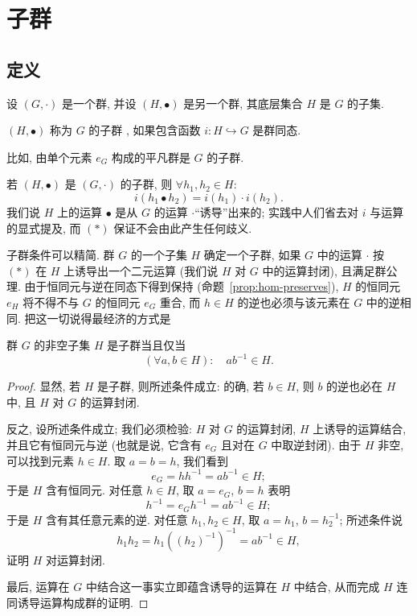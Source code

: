 \section{子群}
\label{subsec:subgroups}

\subsection{定义}
\label{subsec:subgroups-def}

设 $(G, \cdot)$ 是一个群, 并设 $(H, \bullet)$ 是另一个群, 其底层集合 $H$ 是 $G$ 的子集.

\begin{definition}
\label{def:subgroup}
$(H, \bullet)$ 称为 $G$ 的子群%
, 如果包含函数 $i : H \hookrightarrow G$ 是群同态.
\end{definition}

比如, 由单个元素 $e_G$ 构成的平凡群是 $G$ 的子群.

若 $(H, \bullet)$ 是 $(G, \cdot)$ 的子群, 则 $\forall h_1, h_2 \in H$:
\begin{equation*}
i(h_1 \bullet h_2) = i(h_1) \cdot i(h_2). \tag{$*$}
\end{equation*}
我们说 $H$ 上的运算 $\bullet$ 是从 $G$ 的运算 $\cdot$``诱导''出来的; 实践中人们省去对 $i$ 与运算的显式提及, 而 $(*)$ 保证不会由此产生任何歧义.

子群条件可以精简. 群 $G$ 的一个子集 $H$ 确定一个子群, 如果 $G$ 中的运算 $\cdot$ 按 $(*)$ 在 $H$ 上诱导出一个二元运算 (我们说 $H$ 对 $G$ 中的运算封闭), 且满足群公理. 由于恒同元与逆在同态下得到保持 (命题~\ref{prop:hom-preserves}), $H$ 的恒同元 $e_H$ 将不得不与 $G$ 的恒同元 $e_G$ 重合, 而 $h \in H$ 的逆也必须与该元素在 $G$ 中的逆相同. 把这一切说得最经济的方式是

\begin{proposition}
\label{prop:subgroup-criterion}
群 $G$ 的非空子集 $H$ 是子群当且仅当
\[
(\forall a, b \in H): \quad ab^{-1} \in H.
\]
\end{proposition}

\begin{proof}
显然, 若 $H$ 是子群, 则所述条件成立: 的确, 若 $b \in H$, 则 $b$ 的逆也必在 $H$ 中, 且 $H$ 对 $G$ 的运算封闭.

反之, 设所述条件成立; 我们必须检验: $H$ 对 $G$ 的运算封闭, $H$ 上诱导的运算结合, 并且它有恒同元与逆 (也就是说, 它含有 $e_G$ 且对在 $G$ 中取逆封闭). 由于 $H$ 非空, 可以找到元素 $h \in H$. 取 $a = b = h$, 我们看到
\[
e_G = hh^{-1} = ab^{-1} \in H;
\]
于是 $H$ 含有恒同元. 对任意 $h \in H$, 取 $a = e_G$, $b = h$ 表明
\[
h^{-1} = e_G h^{-1} = ab^{-1} \in H;
\]
于是 $H$ 含有其任意元素的逆. 对任意 $h_1, h_2 \in H$, 取 $a = h_1$, $b = h_2^{-1}$; 所述条件说
\[
h_1 h_2 = h_1 ((h_2)^{-1})^{-1} = ab^{-1} \in H,
\]
证明 $H$ 对运算封闭.

最后, 运算在 $G$ 中结合这一事实立即蕴含诱导的运算在 $H$ 中结合, 从而完成 $H$ 连同诱导运算构成群的证明.
\end{proof}

